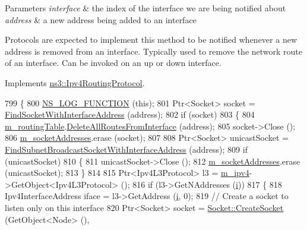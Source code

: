 \begin{DoxyParams}{Parameters}
{\em interface} & the index of the interface we are being notified about \\
\hline
{\em address} & a new address being added to an interface\\
\hline
\end{DoxyParams}
Protocols are expected to implement this method to be notified whenever a new address is removed from an interface. Typically used to remove the \textquotesingle{}network route\textquotesingle{} of an interface. Can be invoked on an up or down interface. 

Implements \hyperlink{classns3_1_1Ipv4RoutingProtocol_a0160e49e509d6699ec837e5485f65cd2}{ns3\+::\+Ipv4\+Routing\+Protocol}.


\begin{DoxyCode}
799 \{
800   \hyperlink{log-macros-disabled_8h_a90b90d5bad1f39cb1b64923ea94c0761}{NS\_LOG\_FUNCTION} (\textcolor{keyword}{this});
801   Ptr<Socket> socket = \hyperlink{classns3_1_1aodv_1_1RoutingProtocol_a7cebc7baa398569f432ea2521310dffe}{FindSocketWithInterfaceAddress} (address);
802   \textcolor{keywordflow}{if} (socket)
803     \{
804       \hyperlink{classns3_1_1aodv_1_1RoutingProtocol_a4e1003a34c8adc96db71096d88c98ae0}{m\_routingTable}.\hyperlink{classns3_1_1aodv_1_1RoutingTable_aab31b6642a68709ff3453c72d979ba1a}{DeleteAllRoutesFromInterface} (address);
805       socket->Close ();
806       \hyperlink{classns3_1_1aodv_1_1RoutingProtocol_aa3263563cbbd735faafbf17fd4e28a10}{m\_socketAddresses}.erase (socket);
807 
808       Ptr<Socket> unicastSocket = \hyperlink{classns3_1_1aodv_1_1RoutingProtocol_ac7263145b54db100e0adc56a06d94c6b}{FindSubnetBroadcastSocketWithInterfaceAddress}
       (address);
809       \textcolor{keywordflow}{if} (unicastSocket)
810         \{
811           unicastSocket->Close ();
812           \hyperlink{classns3_1_1aodv_1_1RoutingProtocol_aa3263563cbbd735faafbf17fd4e28a10}{m\_socketAddresses}.erase (unicastSocket);
813         \}
814 
815       Ptr<Ipv4L3Protocol> l3 = \hyperlink{classns3_1_1aodv_1_1RoutingProtocol_aee33006b1f9d8b24d4722037ff3fec98}{m\_ipv4}->GetObject<Ipv4L3Protocol> ();
816       \textcolor{keywordflow}{if} (l3->GetNAddresses (\hyperlink{bernuolliDistribution_8m_a6f6ccfcf58b31cb6412107d9d5281426}{i}))
817         \{
818           Ipv4InterfaceAddress iface = l3->GetAddress (\hyperlink{bernuolliDistribution_8m_a6f6ccfcf58b31cb6412107d9d5281426}{i}, 0);
819           \textcolor{comment}{// Create a socket to listen only on this interface}
820           Ptr<Socket> socket = \hyperlink{classns3_1_1Socket_ad448a62bb50ad3dbac59c879a885a8d2}{Socket::CreateSocket} (GetObject<Node> (),

\end{DoxyCode}
